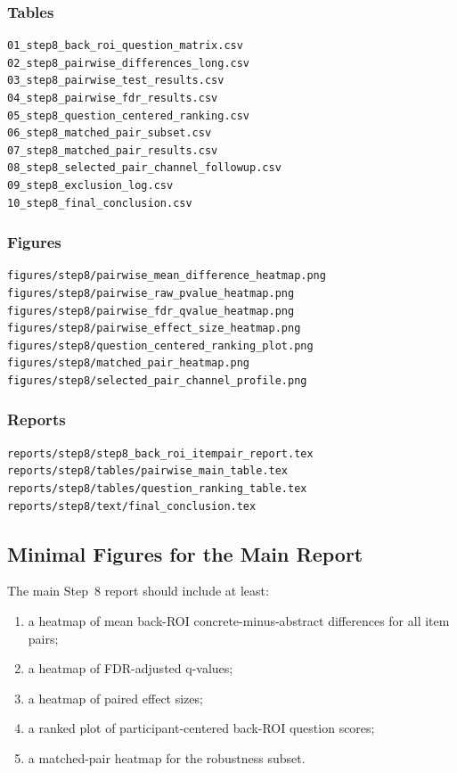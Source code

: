 \documentclass[11pt]{article}
\begin{document}
\subsubsection*{Tables}
\begin{verbatim}
01_step8_back_roi_question_matrix.csv
02_step8_pairwise_differences_long.csv
03_step8_pairwise_test_results.csv
04_step8_pairwise_fdr_results.csv
05_step8_question_centered_ranking.csv
06_step8_matched_pair_subset.csv
07_step8_matched_pair_results.csv
08_step8_selected_pair_channel_followup.csv
09_step8_exclusion_log.csv
10_step8_final_conclusion.csv
\end{verbatim}

\subsubsection*{Figures}
\begin{verbatim}
figures/step8/pairwise_mean_difference_heatmap.png
figures/step8/pairwise_raw_pvalue_heatmap.png
figures/step8/pairwise_fdr_qvalue_heatmap.png
figures/step8/pairwise_effect_size_heatmap.png
figures/step8/question_centered_ranking_plot.png
figures/step8/matched_pair_heatmap.png
figures/step8/selected_pair_channel_profile.png
\end{verbatim}

\subsubsection*{Reports}
\begin{verbatim}
reports/step8/step8_back_roi_itempair_report.tex
reports/step8/tables/pairwise_main_table.tex
reports/step8/tables/question_ranking_table.tex
reports/step8/text/final_conclusion.tex
\end{verbatim}

\subsection{Minimal Figures for the Main Report}
The main Step~8 report should include at least:
\begin{enumerate}
    \item a heatmap of mean back-ROI concrete-minus-abstract differences for all item pairs;
    \item a heatmap of FDR-adjusted q-values;
    \item a heatmap of paired effect sizes;
    \item a ranked plot of participant-centered back-ROI question scores;
    \item a matched-pair heatmap for the robustness subset.
\end{enumerate}
\end{document}
